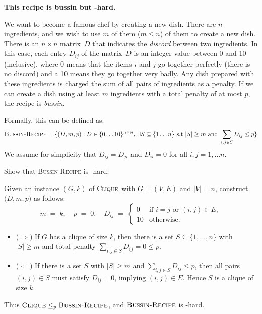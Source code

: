 \documentclass[11pt,addpoints, answers]{exam}
\begin{document}
\begin{questions}
    \pagebreak


    \newcommand{\Clique}
    {\textsc{Clique}}
    \newcommand{\Recipe}
    {\textsc{Bussin-Recipe}}
    
    \question [12] \textbf{This recipe is bussin but \NP-hard.} 
    
    We want to become a famous chef by creating a new dish.  There are $n$ ingredients, and we wish to use $m$ of them ($m\leq n$) of them to create a new dish.  There is an $n \times n$ matrix~$D$ that indicates the \emph{discord} between two ingredients.  In this case, each entry $D_{ij}$ of the matrix~$D$ is an integer value between 0 and 10 (inclusive), where 0 means that the items $i$ and $j$ go together perfectly (there is no discord) and a 10 means they go together very badly.  Any dish prepared with these ingredients is charged the sum of all pairs of ingredients as a penalty. If we can create a dish using at least $m$ ingredients with a total penalty of at most $p$, the recipe is \emph{bussin}.

    Formally, this can be defined as:
    \[
        \Recipe = \set{(D, m, p) : D \in \set{0 \ldots 10}^{n \times n} \text{, } \exists S \subseteq \{1 \ldots n\} \text{ s.t } |S| \geq m \text{ and } \sum_{i,j \in S} D_{ij} \leq p}
    \]
    We assume for simplicity that $D_{ij} = D_{ji}$ and $D_{ii} = 0$ for all $i,j = 1, \ldots n$. 
    
Show that \Recipe\xspace is \NP-hard.

\begin{solution}
Given an instance \((G,k)\) of \Clique\ with \(G=(V,E)\) and \(|V| = n\), construct \(\bigl(D,m,p\bigr)\) as follows:
\[
m \;=\; k,\quad p \;=\; 0,\quad 
D_{ij} \;=\;
\begin{cases}
0 & \text{if } i=j \text{ or } (i,j)\in E,\\
10 & \text{otherwise}.
\end{cases}
\]
\begin{itemize}
\item (\(\Rightarrow\)) If \(G\) has a clique of size \(k\), then there is a set \(S\subseteq\{1,\dots,n\}\) with \(|S|\ge m\) and total penalty \(\sum_{i,j \in S}D_{ij}=0\le p\). 
\item (\(\Leftarrow\)) If there is a set \(S\) with \(|S|\ge m\) and \(\sum_{i,j\in S}D_{ij}\le p\), then all pairs \((i,j)\in S\) must satisfy \(D_{ij}=0\), implying \((i,j)\in E\). Hence \(S\) is a clique of size \(k\). 
\end{itemize}
Thus \(\Clique \le_p \Recipe\), and \(\Recipe\) is \NP-hard.


\end{solution}
\end{questions}
\end{document}
